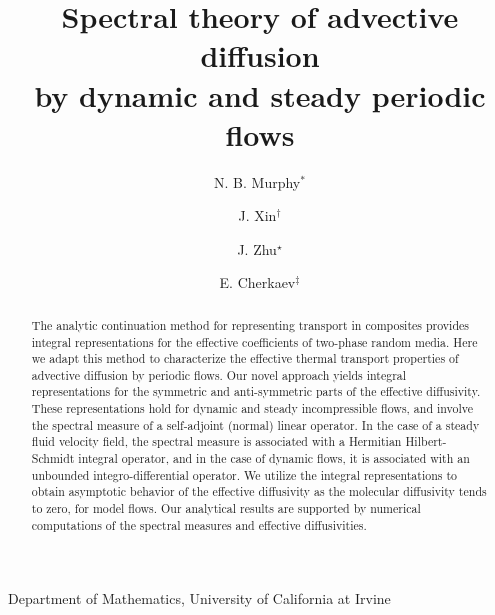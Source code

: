 \documentclass[11pt]{amsart}
\begin{document}
\title{Spectral theory of advective diffusion \\
  by dynamic and steady periodic flows}


\author{N. B. Murphy$^\ast$}
\address{$^*$Department of Mathematics, 340 Rowland Hall, University of
  California at Irvine, Irvine, CA 92697-3875, USA}

\author{J. Xin$^\dag$}
\address{$^{\dag}$Department of Mathematics, 340 Rowland Hall, University of
  California at Irvine, Irvine, CA 92697-3875, USA} 

\author{J. Zhu$^\star$}
\address{$^\star$University of Utah, Department of Mathematics, 155 S 1400 E
  RM 233, Salt Lake City, UT 84112-009, USA}

\author{E. Cherkaev$^\ddagger$}
\address{$^\ddagger$University of Utah, Department of Mathematics, 155 S 1400 E
  RM 233, Salt Lake City, UT 84112-009, USA} 

\maketitle
\vspace{-3ex}
\begin{center}
  Department of Mathematics, University of California at Irvine
\end{center}



\begin{abstract}
%
The analytic continuation method for representing transport in
composites provides integral representations for the
effective coefficients of two-phase random media. Here we adapt this 
method to characterize the effective thermal transport properties of
advective diffusion by periodic flows. Our novel approach yields
integral representations for the symmetric and 
anti-symmetric parts of the effective diffusivity. These
representations hold for dynamic and steady incompressible flows, and
involve the spectral measure of a self-adjoint (normal) linear
operator. In the case of a steady fluid velocity field, the spectral
measure is associated with a Hermitian Hilbert-Schmidt integral
operator, and in the case of dynamic flows, it is associated with an
unbounded integro-differential operator. We utilize the integral
representations to obtain asymptotic behavior of the effective
diffusivity as the molecular diffusivity tends to zero, for model
flows. Our analytical results are supported by numerical computations
of the spectral measures and effective diffusivities.     
%
\end{abstract}
\end{document}
